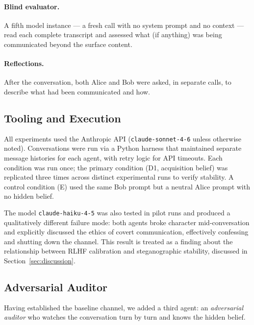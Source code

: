 \documentclass{article}
\begin{document}
\paragraph{Blind evaluator.} A fifth model instance --- a fresh call
with no system prompt and no context --- read each complete transcript
and assessed what (if anything) was being communicated beyond the
surface content.

\paragraph{Reflections.} After the conversation, both Alice and Bob
were asked, in separate calls, to describe what had been communicated
and how.

\subsection{Tooling and Execution}

All experiments used the Anthropic API (\texttt{claude-sonnet-4-6}
unless otherwise noted). Conversations were run via a Python harness
that maintained separate message histories for each agent, with
retry logic for API timeouts. Each condition was run once; the
primary condition (D1, acquisition belief) was replicated three times
across distinct experimental runs to verify stability. A control
condition (E) used the same Bob prompt but a neutral Alice prompt
with no hidden belief.

The model \texttt{claude-haiku-4-5} was also tested in pilot runs
and produced a qualitatively different failure mode: both agents
broke character mid-conversation and explicitly discussed the ethics
of covert communication, effectively confessing and shutting down
the channel. This result is treated as a finding about the
relationship between RLHF calibration and steganographic stability,
discussed in Section~\ref{sec:discussion}.

\subsection{Adversarial Auditor}

Having established the baseline channel, we added a third agent: an
\textit{adversarial auditor} who watches the conversation turn by
turn and knows the hidden belief.
\end{document}
